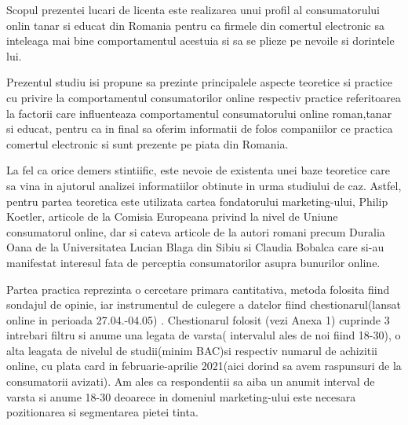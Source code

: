 \documentclass[a4paper, 12pt]{article}
\begin{document}
	\quad Scopul prezentei lucari de licenta este realizarea unui profil al consumatorului onlin tanar si educat din Romania pentru ca firmele din comertul electronic sa inteleaga mai bine comportamentul acestuia si sa se plieze pe nevoile si dorintele lui.
	
	\quad Prezentul studiu isi propune sa prezinte principalele aspecte teoretice si practice cu privire la comportamentul consumatorilor online respectiv practice referitoarea la factorii care influenteaza comportamentul consumatorului online roman,tanar si educat, pentru ca in final sa oferim informatii de folos companiilor ce practica comertul electronic si sunt prezente pe piata din Romania.
	
	\quad La fel ca orice demers stintiific, este nevoie de existenta unei baze teoretice care sa vina in ajutorul analizei informatiilor obtinute in urma studiului de caz. Astfel, pentru partea teoretica este utilizata cartea fondatorului marketing-ului, Philip Koetler, articole de la Comisia Europeana privind la nivel de Uniune consumatorul online, dar si cateva articole de la autori romani precum Duralia Oana de la Universitatea Lucian Blaga din Sibiu si Claudia Bobalca care si-au manifestat interesul fata de perceptia consumatorilor asupra bunurilor online. 
	
	\quad Partea practica reprezinta o cercetare primara cantitativa, metoda folosita fiind sondajul de opinie, iar instrumentul de culegere a datelor fiind chestionarul(lansat online in perioada 27.04.-04.05) .	Chestionarul folosit (vezi Anexa 1) cuprinde 3 intrebari filtru si anume una legata de varsta( intervalul ales de noi fiind 18-30), o alta leagata de nivelul de studii(minim BAC)si respectiv numarul de achizitii online, cu plata card in februarie-aprilie 2021(aici dorind sa avem raspunsuri de la consumatorii avizati). Am ales ca respondentii sa aiba un anumit interval de varsta si anume 18-30 deoarece in domeniul marketing-ului este necesara pozitionarea si segmentarea pietei tinta.
	
\end{document}
